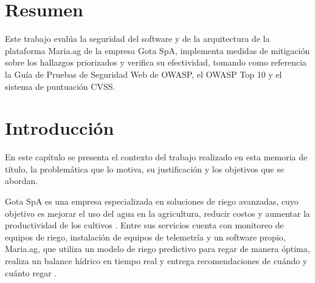\documentclass[12pt,letterpaper]{report}
\begin{document}
\newpage

\renewcommand{\contentsname}{Índice}
\tableofcontents

\newpage


\chapter*{Resumen}

Este trabajo evalúa la seguridad del software y de la arquitectura de la
plataforma Maria.ag de la empresa Gota SpA, implementa medidas de mitigación
sobre los hallazgos priorizados y verifica su efectividad, tomando como
referencia la Guía de Pruebas de Seguridad Web de OWASP, el OWASP Top 10 y el
sistema de puntuación CVSS.

\newpage

\chapter*{Introducción}

En este capítulo se presenta el contexto del trabajo realizado en esta memoria
de título, la problemática que lo motiva, su justificación y los objetivos que
se abordan.

Gota SpA es una empresa especializada en soluciones de riego avanzadas, cuyo
objetivo es mejorar el uso del agua en la agricultura, reducir costos y
aumentar la productividad de los cultivos \autocite{gota}. Entre sus servicios
cuenta con monitoreo de equipos de riego, instalación de equipos de telemetría
y un software propio, Maria.ag, que utiliza un modelo de riego predictivo para
regar de manera óptima, realiza un balance hídrico en tiempo real y entrega
recomendaciones de cuándo y cuánto regar \autocite{gota,gota2024maria}.
\end{document}
